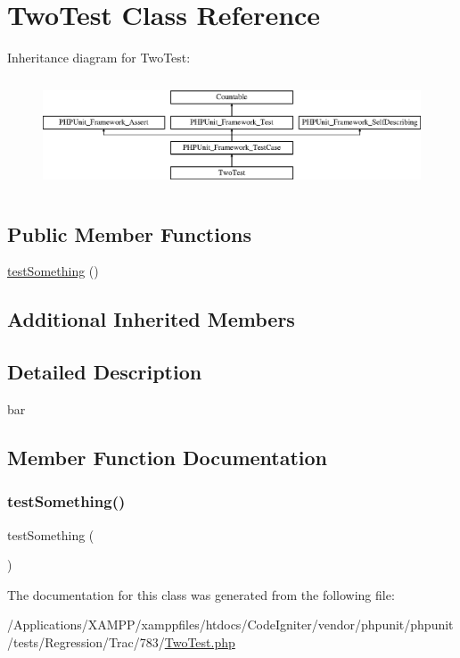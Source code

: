 \hypertarget{class_two_test}{}\section{Two\+Test Class Reference}
\label{class_two_test}
Inheritance diagram for Two\+Test\+:\begin{figure}[H]
\begin{center}
\leavevmode
\includegraphics[height=3.303835cm]{class_two_test}
\end{center}
\end{figure}
\subsection*{Public Member Functions}
\begin{DoxyCompactItemize}
\item 
\mbox{\hyperlink{class_two_test_a0fc4e17369bc9607ebdd850d9eda8167}{test\+Something}} ()
\end{DoxyCompactItemize}
\subsection*{Additional Inherited Members}


\subsection{Detailed Description}
bar 

\subsection{Member Function Documentation}
\mbox{\label{class_two_test_a0fc4e17369bc9607ebdd850d9eda8167}} 
\subsubsection{\texorpdfstring{test\+Something()}{testSomething()}}
{\footnotesize\ttfamily test\+Something (\begin{DoxyParamCaption}{ }\end{DoxyParamCaption})}



The documentation for this class was generated from the following file\+:\begin{DoxyCompactItemize}
\item 
/\+Applications/\+X\+A\+M\+P\+P/xamppfiles/htdocs/\+Code\+Igniter/vendor/phpunit/phpunit/tests/\+Regression/\+Trac/783/\mbox{\hyperlink{_two_test_8php}{Two\+Test.\+php}}\end{DoxyCompactItemize}
